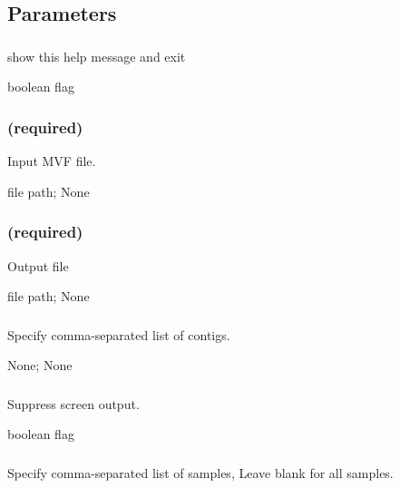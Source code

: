 \documentclass[letterpaper,11pt,english]{sphinxmanual}
\begin{document}
\subsection{Parameters}
\label{\detokenize{prog_desc:id69}}

\subsubsection{}
\label{\detokenize{prog_desc:id70}}
 show this help message and exit

 boolean flag


\subsubsection{ (required)}
\label{\detokenize{prog_desc:id71}}
 Input MVF file.

 file path;  None


\subsubsection{ (required)}
\label{\detokenize{prog_desc:id72}}
 Output file

 file path;  None


\subsubsection{}
\label{\detokenize{prog_desc:id73}}
 Specify comma-separated list of contigs.

 None;  None


\subsubsection{}
\label{\detokenize{prog_desc:id74}}
 Suppress screen output.

 boolean flag


\subsubsection{}
\label{\detokenize{prog_desc:id75}}
 Specify comma-separated list of samples, Leave blank for all samples.
\end{document}
